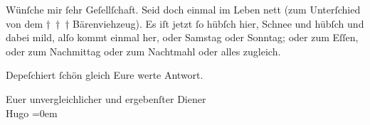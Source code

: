                Wünſche mir{ }ſehr Geſellſchaft. Seid doch einmal im Leben nett (zum Unterſchied von
               dem † † † Bärenviehzeug). Es iſt jetzt{ }ſo hübſch hier, Schnee und hübſch und dabei
               mild, alſo {\pb}kommt einmal her, oder Samstag oder Sonntag; oder zum Eſſen,
               oder zum Nachmittag oder zum Nachtmahl oder alles zugleich.\pend
           
\pstart
           Depeſchiert{ }ſchön gleich Eure werte Antwort.\pend
           
\pstart
           Euer unvergleichlicher und ergebenſter Diener{\\[\baselineskip]}\spacefill\mbox{Hugo}\pend
           \leftskip=0em{}\endnumbering{}  \newcommand{\dateiname}{L01655}\newcommand{\titel}{Hugo von Hofmannsthal an Arthur Schnitzler, [zwischen 3. – 7. 2. 1907]}\newcommand{\editorInnen}{Martin Anton Müller und Gerd-Hermann Susen}
